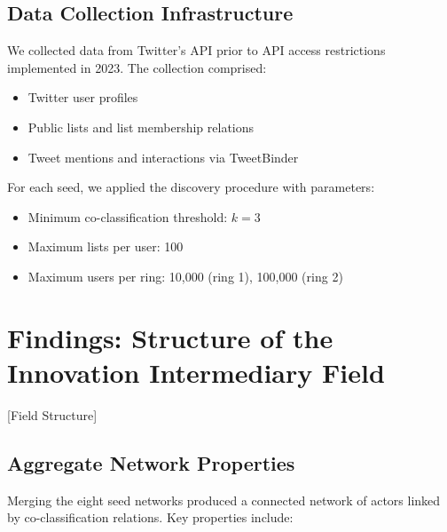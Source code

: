 \documentclass[../main.tex]{subfiles}
\begin{document}
\subsection{Data Collection Infrastructure}

We collected data from Twitter's API prior to API access restrictions implemented in 2023. The collection comprised:

\begin{itemize}
    \item Twitter user profiles
    \item Public lists and list membership relations
    \item Tweet mentions and interactions via TweetBinder
\end{itemize}

For each seed, we applied the discovery procedure with parameters:
\begin{itemize}
    \item Minimum co-classification threshold: $k = 3$
    \item Maximum lists per user: 100
    \item Maximum users per ring: 10,000 (ring 1), 100,000 (ring 2)
\end{itemize}


\section{Findings: Structure of the Innovation Intermediary Field}[Field Structure]

\subsection{Aggregate Network Properties}

Merging the eight seed networks produced a connected network of actors linked by co-classification relations. Key properties include:
\end{document}
